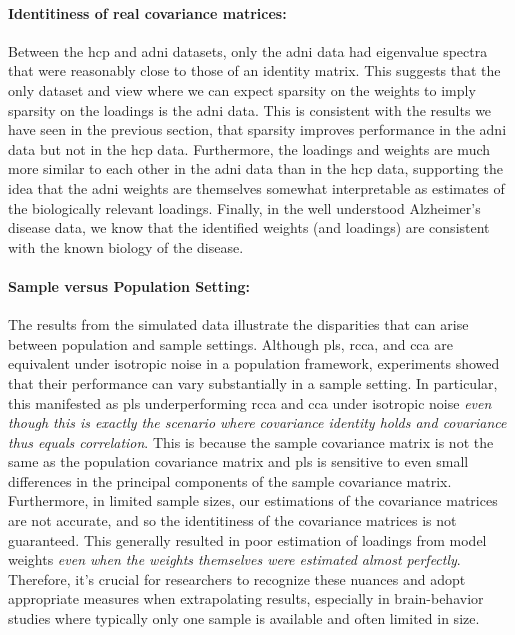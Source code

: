 \paragraph{Identitiness of real covariance matrices:} Between the \acrshort{hcp} and \acrshort{adni} datasets, only the \acrshort{adni} data had eigenvalue spectra that were reasonably close to those of an identity matrix.
This suggests that the only dataset and view where we can expect sparsity on the \gls{weights} to imply sparsity on the \gls{loadings} is the \acrshort{adni} data.
This is consistent with the results we have seen in the previous section, that sparsity improves performance in the \acrshort{adni} data but not in the \acrshort{hcp} data.
Furthermore, the \gls{loadings} and \gls{weights} are much more similar to each other in the \acrshort{adni} data than in the \acrshort{hcp} data, supporting the idea that the \acrshort{adni} \gls{weights} are themselves somewhat interpretable as estimates of the biologically relevant loadings.
Finally, in the well understood Alzheimer's disease data, we know that the identified \gls{weights} (and loadings) are consistent with the known biology of the disease.

\paragraph{Sample versus Population Setting:} The results from the simulated data illustrate the disparities that can arise between population and sample settings.
Although \acrshort{pls}, \acrshort{rcca}, and \acrshort{cca} are equivalent under isotropic noise in a population framework, experiments showed that their performance can vary substantially in a sample setting.
In particular, this manifested as \acrshort{pls} underperforming \acrshort{rcca} and \acrshort{cca} under isotropic noise \textit{even though this is exactly the scenario where covariance identity holds and covariance thus equals correlation}.
This is because the sample covariance matrix is not the same as the population covariance matrix and \acrshort{pls} is sensitive to even small differences in the principal components of the sample covariance matrix.
Furthermore, in limited sample sizes, our estimations of the covariance matrices are not accurate, and so the identitiness of the covariance matrices is not guaranteed.
This generally resulted in poor estimation of \gls{loadings} from model \gls{weights} \textit{even when the \gls{weights} themselves were estimated almost perfectly}.
Therefore, it's crucial for researchers to recognize these nuances and adopt appropriate measures when extrapolating results, especially in brain-behavior studies where typically only one sample is available and often limited in size.

